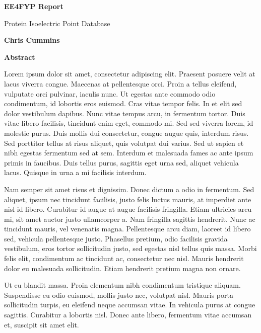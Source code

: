 \thispagestyle{plain}
\begin{center}
  \Large
  \textbf{EE4FYP Report}

  \vspace{0.4cm}
  \large
  Protein Isoelectric Point Database

  \vspace{0.4cm}
  \textbf{Chris Cummins}

  \vspace{0.9cm}
  \textbf{Abstract}
\end{center}

Lorem ipsum dolor sit amet, consectetur adipiscing elit. Praesent
posuere velit at lacus viverra congue. Maecenas at pellentesque
orci. Proin a tellus eleifend, vulputate orci pulvinar, iaculis
nunc. Ut egestas ante commodo odio condimentum, id lobortis eros
euismod. Cras vitae tempor felis. In et elit sed dolor vestibulum
dapibus. Nunc vitae tempus arcu, in fermentum tortor. Duis vitae
libero facilisis, tincidunt enim eget, commodo mi. Sed sed viverra
lorem, id molestie purus. Duis mollis dui consectetur, congue augue
quis, interdum risus. Sed porttitor tellus at risus aliquet, quis
volutpat dui varius. Sed ut sapien et nibh egestas fermentum sed at
sem. Interdum et malesuada fames ac ante ipsum primis in
faucibus. Duis tellus purus, sagittis eget urna sed, aliquet vehicula
lacus. Quisque in urna a mi facilisis interdum.

Nam semper sit amet risus et dignissim. Donec dictum a odio in
fermentum. Sed aliquet, ipsum nec tincidunt facilisis, justo felis
luctus mauris, at imperdiet ante nisl id libero. Curabitur id augue at
augue facilisis fringilla. Etiam ultricies arcu mi, sit amet auctor
justo ullamcorper a. Nam fringilla sagittis hendrerit. Nunc ac
tincidunt mauris, vel venenatis magna. Pellentesque arcu diam, laoreet
id libero sed, vehicula pellentesque justo. Phasellus pretium, odio
facilisis gravida vestibulum, eros tortor sollicitudin justo, sed
egestas nisl tellus quis massa. Morbi felis elit, condimentum ac
tincidunt ac, consectetur nec nisl. Mauris hendrerit dolor eu
malesuada sollicitudin. Etiam hendrerit pretium magna non ornare.

Ut eu blandit massa. Proin elementum nibh condimentum tristique
aliquam. Suspendisse eu odio euismod, mollis justo nec, volutpat
nisl. Mauris porta sollicitudin turpis, eu eleifend neque accumsan
vitae. In vehicula purus at congue sagittis. Curabitur a lobortis
nisl. Donec ante libero, fermentum vitae accumsan et, suscipit sit
amet elit.

